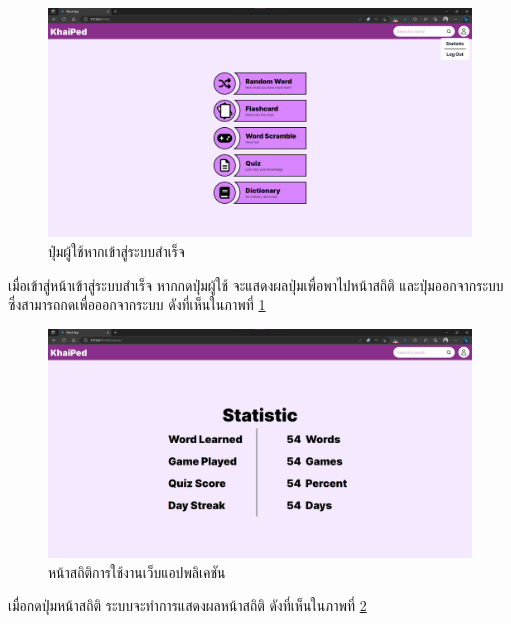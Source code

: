 \documentclass[12pt,oneside,openright,a4paper]{cpe-thai-project}
\begin{document}
\pagebreak
\begin{figure}[!h]\centering
	\includegraphics[width=\textwidth, keepaspectratio=true]{image/chap4/UI/user button.png}
	\caption{{ปุ่มผู้ใช้หากเข้าสู่ระบบสำเร็จ}}\label{fig:chap4UIUserButton}
\end{figure}
\hspace{1cm}
เมื่อเข้าสู่หน้าเข้าสู่ระบบสำเร็จ หากกดปุ่มผู้ใช้ จะแสดงผลปุ่มเพื่อพาไปหน้าสถิติ และปุ่มออกจากระบบ ซึ่งสามารถกดเพื่อออกจากระบบ
ดังที่เห็นในภาพที่ \ref{fig:chap4UIUserButton}

\begin{figure}[!h]\centering
	\includegraphics[width=\textwidth, keepaspectratio=true]{image/chap4/UI/stat.png}
	\caption{{หน้าสถิติการใช้งานเว็บแอปพลิเคชัน}}\label{fig:chap4UIStat}
\end{figure}
\hspace{1cm}
เมื่อกดปุ่มหน้าสถิติ ระบบจะทำการแสดงผลหน้าสถิติ ดังที่เห็นในภาพที่ \ref{fig:chap4UIStat} 
\end{document}
